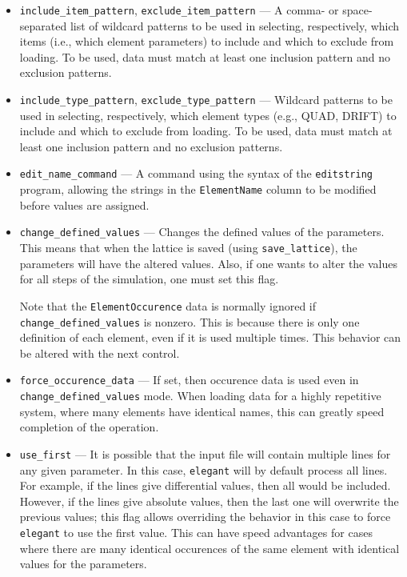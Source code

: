\documentclass[11pt]{article}
\begin{document}
\begin{itemize}
\item \verb|include_item_pattern|, \verb|exclude_item_pattern| ---
A comma- or space-separated list of wildcard patterns to be used in selecting, respectively, which items
(i.e., which element parameters) to include and which to exclude from
loading.
To be used, data must match at least one inclusion pattern and no exclusion patterns.


\item \verb|include_type_pattern|, \verb|exclude_type_pattern| ---
Wildcard patterns to be used in selecting, respectively, which element
types (e.g., QUAD, DRIFT) to include and which to exclude from
loading.
To be used, data must match at least one inclusion pattern and no exclusion patterns.

\item \verb|edit_name_command| --- A command using the syntax of the {\tt editstring} program, allowing
  the strings in the \verb|ElementName| column to be modified before values are assigned.

\item \verb|change_defined_values| --- Changes the defined values of
the parameters.  This means that when the lattice is saved (using
\verb|save_lattice|), the parameters will have the altered values.
Also, if one wants to alter the values for all steps of the simulation,
one must set this flag. 

Note that the \verb|ElementOccurence| data is normally ignored if
\verb|change_defined_values| is nonzero.  This is because there is
only one definition of each element, even if it is used multiple times.
This behavior can be altered with the next control.

\item \verb|force_occurence_data| --- If set, then occurence data is
used even in \verb|change_defined_values| mode. When loading data for
a highly repetitive system, where many elements have identical names, this can greatly
speed completion of the operation.

\item \verb|use_first| --- It is possible that the input file will contain
multiple lines for any given parameter.  In this case, {\tt elegant} will
by default process all lines.  For example, if the lines give differential values,
then all would be included. However, if the lines give absolute values, then the
last one will overwrite the previous values; this flag allows overriding the
behavior in this case to force {\tt elegant} to use the first value.
This can have speed advantages for cases where there are many identical
occurences of the same element with identical values for the parameters.


\end{itemize}
\end{document}
